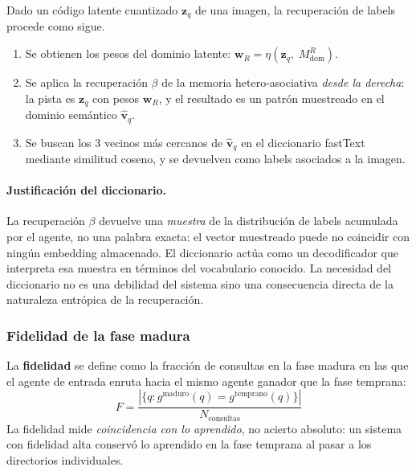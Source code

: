 Dado un código latente cuantizado $\mathbf{z}_q$ de una imagen, la recuperación
de labels procede como sigue.

\begin{enumerate}
    \item Se obtienen los pesos del dominio latente:
    $\mathbf{w}_R = \eta(\mathbf{z}_q,\; M^R_{\mathrm{dom}})$.

    \item Se aplica la recuperación $\beta$ de la memoria hetero-asociativa \emph{desde la
    derecha}: la pista es $\mathbf{z}_q$ con pesos $\mathbf{w}_R$, y el resultado es un
    patrón muestreado en el dominio semántico $\hat{\mathbf{v}}_q$.

    \item Se buscan los 3 vecinos más cercanos de $\hat{\mathbf{v}}_q$ en el diccionario
    fastText mediante similitud coseno, y se devuelven como labels asociados a la imagen.
\end{enumerate}

\paragraph{Justificación del diccionario.}
La recuperación $\beta$ devuelve una \emph{muestra} de la distribución de labels acumulada
por el agente, no una palabra exacta: el vector muestreado puede no coincidir con ningún
embedding almacenado.
El diccionario actúa como un decodificador que interpreta esa muestra en términos del
vocabulario conocido.
La necesidad del diccionario no es una debilidad del sistema sino una consecuencia
directa de la naturaleza entrópica de la recuperación.

\subsubsection*{Fidelidad de la fase madura}

La \textbf{fidelidad} se define como la fracción de consultas en la fase madura en las
que el agente de entrada enruta hacia el mismo agente ganador que la fase temprana:
\begin{equation}
    F = \frac{|\{q : g^{\mathrm{maduro}}(q) = g^{\mathrm{temprano}}(q)\}|}{N_{\mathrm{consultas}}}
    \label{eq:fidelidad}
\end{equation}
La fidelidad mide \emph{coincidencia con lo aprendido}, no acierto absoluto:
un sistema con fidelidad alta conservó lo aprendido en la fase temprana al pasar
a los directorios individuales.
